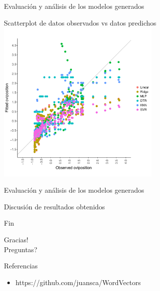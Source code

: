 \documentclass[10pt]{beamer}
\begin{document}
\begin{frame}{Evaluación y análisis de los modelos generados}
  \begin{center}
    Scatterplot de datos observados vs datos predichos
    \includegraphics[width=0.6\textwidth]{scatterplot}
  \end{center}
\end{frame}




\begin{frame}{Evaluación y análisis de los modelos generados}
  \begin{center}
    Discusión de resultados obtenidos
  \end{center}
\end{frame}


\begin{frame}{Fin}
  \begin{center}
    Gracias! \\ Preguntas?
  \end{center}
\end{frame}


\begin{frame}{Referencias}
  \begin{itemize}
    \item https://github.com/juansca/WordVectors

  \end{itemize}
\end{frame}








\appendix
\end{document}
